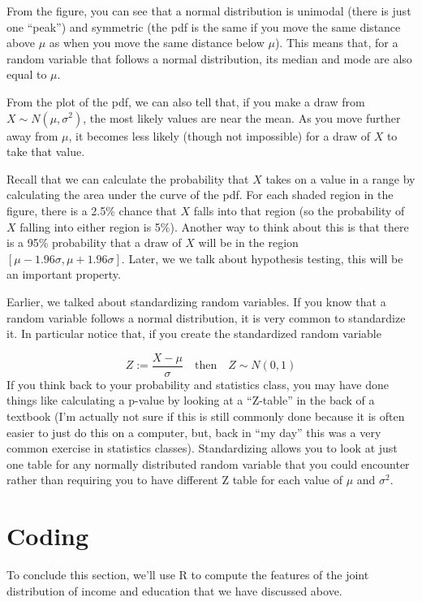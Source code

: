 \documentclass[
  letterpaper,
  DIV=11,
  numbers=noendperiod]{scrreprt}
\begin{document}
From the figure, you can see that a normal distribution is unimodal
(there is just one ``peak'') and symmetric (the pdf is the same if you
move the same distance above \(\mu\) as when you move the same distance
below \(\mu\)). This means that, for a random variable that follows a
normal distribution, its median and mode are also equal to \(\mu\).

From the plot of the pdf, we can also tell that, if you make a draw from
\(X \sim N(\mu,\sigma^2)\), the most likely values are near the mean. As
you move further away from \(\mu\), it becomes less likely (though not
impossible) for a draw of \(X\) to take that value.

Recall that we can calculate the probability that \(X\) takes on a value
in a range by calculating the area under the curve of the pdf. For each
shaded region in the figure, there is a 2.5\% chance that \(X\) falls
into that region (so the probability of \(X\) falling into either region
is 5\%). Another way to think about this is that there is a 95\%
probability that a draw of \(X\) will be in the region
\([\mu-1.96\sigma, \mu+1.96\sigma]\). Later, we we talk about hypothesis
testing, this will be an important property.

Earlier, we talked about standardizing random variables. If you know
that a random variable follows a normal distribution, it is very common
to standardize it. In particular notice that, if you create the
standardized random variable

\[
  Z := \frac{X - \mu}{\sigma} \quad \textrm{then} \quad Z \sim N(0,1)
\] If you think back to your probability and statistics class, you may
have done things like calculating a p-value by looking at a ``Z-table''
in the back of a textbook (I'm actually not sure if this is still
commonly done because it is often easier to just do this on a computer,
but, back in ``my day'' this was a very common exercise in statistics
classes). Standardizing allows you to look at just one table for any
normally distributed random variable that you could encounter rather
than requiring you to have different Z table for each value of \(\mu\)
and \(\sigma^2\).

\section{Coding}\label{coding}

To conclude this section, we'll use R to compute the features of the
joint distribution of income and education that we have discussed above.
\end{document}

